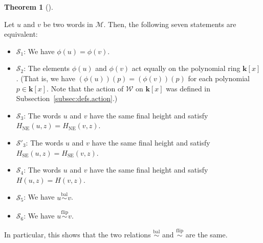 \documentclass[numbers=enddot,12pt,final,onecolumn,notitlepage]{scrartcl}%
\theoremstyle{definition}
\newtheorem{theo}{Theorem}[section]
\newenvironment{theorem}[1][]
{\begin{theo}[#1]\begin{leftbar}}
{\end{leftbar}\end{theo}}
\newcommand{\W}{\mathcal{W}}
\newcommand{\M}{\mathcal{M}}
\newcommand{\kk}{\mathbf{k}}
\newcommand{\SE}{\operatorname{SE}}
\newcommand{\NE}{\operatorname{NE}}
\newcommand{\balsim}{\overset{\operatorname*{bal}}{\sim}}
\newcommand{\flipsim}{\overset{\operatorname*{flip}}{\sim}}
\newcommand{\tup}[1]{\left( #1 \right)}
\newcommand{\ive}[1]{\left[ #1 \right]}
\begin{document}
\begin{theorem}
\label{thm.DU-eqs2}
Let $u$ and $v$ be two words in $\M$.
Then, the following seven statements are equivalent:

\begin{itemize}
\item $\mathcal{S}_1$: We have $\phi\tup{u} = \phi\tup{v}$.

\item $\mathcal{S}_2$: The elements $\phi\tup{u}$ and
$\phi\tup{v}$ act equally on the polynomial ring $\kk\ive{x}$.
(That is, we have
$\tup{\phi\tup{u}} \tup{p} = \tup{\phi\tup{v}} \tup{p}$
for each polynomial $p \in \kk\ive{x}$.
Note that the action of $\W$ on $\kk\left[x\right]$
was defined in Subsection~\ref{subsec:defs.action}.)

\item $\mathcal{S}_3$: The words $u$ and $v$ have the same final
height and satisfy $H_{\NE}\tup{u, z} = H_{\NE}\tup{v, z}$.

\item $\mathcal{S}'_3$: The words $u$ and $v$ have the same final
height and satisfy $H_{\SE}\tup{u, z} = H_{\SE}\tup{v, z}$.

\item $\mathcal{S}_4$: The words $u$ and $v$ have the same final
height and satisfy $H\tup{u, z} = H\tup{v, z}$.

\item $\mathcal{S}_5$: We have $u \balsim v$.

\item $\mathcal{S}_6$: We have $u \flipsim v$.
\end{itemize}
\end{theorem}


In particular, this shows that the two relations $\balsim$ and $\flipsim$ are the same. 
\end{document}
